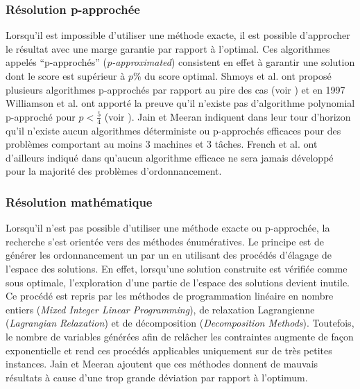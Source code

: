 \subsubsection{Résolution p-approchée}
Lorsqu'il est impossible d'utiliser une méthode exacte, il est possible d'approcher le résultat avec une marge garantie par rapport à l'optimal. Ces algorithmes appelés ``p-approchés'' (\textit{p-approximated}) consistent en effet à garantir une solution dont le score est supérieur à $p$\% du score optimal. Shmoys et al. ont proposé plusieurs algorithmes p-approchés par rapport au pire des cas (voir \cite{Shmoys1994}) et en 1997 Williamson et al. ont apporté la preuve qu'il n'existe pas d'algorithme polynomial p-approché pour $p < \frac{5}{4}$ (voir \cite{Williamson1997}). Jain et Meeran indiquent dans leur tour d'horizon qu'il n'existe aucun algorithmes déterministe ou p-approchés efficaces pour des problèmes comportant au moins 3 machines et 3 tâches. French et al. ont d'ailleurs indiqué dans \cite{French1982} qu'aucun algorithme efficace ne sera jamais développé pour la majorité des problèmes d'ordonnancement.

\subsubsection{Résolution mathématique}
Lorsqu'il n'est pas possible d'utiliser une méthode exacte ou p-approchée, la recherche s'est orientée vers des méthodes énumératives. Le principe est de générer les ordonnancement un par un en utilisant des procédés d'élagage de l'espace des solutions. En effet, lorsqu'une solution construite est vérifiée comme sous optimale, l'exploration d'une partie de l'espace des solutions devient inutile. Ce procédé est repris par les méthodes de programmation linéaire en nombre entiers (\textit{Mixed Integer Linear Programming}), de relaxation Lagrangienne (\textit{Lagrangian Relaxation}) et de décomposition (\textit{Decomposition Methods}). Toutefois, le nombre de variables générées afin de relâcher les contraintes augmente de façon exponentielle et rend ces procédés applicables uniquement sur de très petites instances. Jain et Meeran ajoutent que ces méthodes donnent de mauvais résultats à cause d'une trop grande déviation par rapport à l'optimum.

